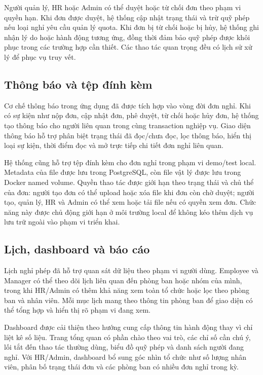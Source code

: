 Người quản lý, HR hoặc Admin có thể duyệt hoặc từ chối đơn theo phạm vi quyền hạn. Khi đơn được duyệt, hệ thống cập nhật trạng thái và trừ quỹ phép nếu loại nghỉ yêu cầu quản lý quota. Khi đơn bị từ chối hoặc bị hủy, hệ thống ghi nhận lý do hoặc hành động tương ứng, đồng thời đảm bảo quỹ phép được khôi phục trong các trường hợp cần thiết. Các thao tác quan trọng đều có lịch sử xử lý để phục vụ truy vết.

\subsection{Thông báo và tệp đính kèm}
Cơ chế thông báo trong ứng dụng đã được tích hợp vào vòng đời đơn nghỉ. Khi có sự kiện như nộp đơn, cập nhật đơn, phê duyệt, từ chối hoặc hủy đơn, hệ thống tạo thông báo cho người liên quan trong cùng transaction nghiệp vụ. Giao diện thông báo hỗ trợ phân biệt trạng thái đã đọc/chưa đọc, lọc thông báo, hiển thị loại sự kiện, thời điểm đọc và mở trực tiếp chi tiết đơn nghỉ liên quan.

Hệ thống cũng hỗ trợ tệp đính kèm cho đơn nghỉ trong phạm vi demo/test local. Metadata của file được lưu trong PostgreSQL, còn file vật lý được lưu trong Docker named volume. Quyền thao tác được giới hạn theo trạng thái và chủ thể của đơn: người tạo đơn có thể upload hoặc xóa file khi đơn còn chờ duyệt; người tạo, quản lý, HR và Admin có thể xem hoặc tải file nếu có quyền xem đơn. Chức năng này được chủ động giới hạn ở môi trường local để không kéo thêm dịch vụ lưu trữ ngoài vào phạm vi triển khai.

\subsection{Lịch, dashboard và báo cáo}
Lịch nghỉ phép đã hỗ trợ quan sát dữ liệu theo phạm vi người dùng. Employee và Manager có thể theo dõi lịch liên quan đến phòng ban hoặc nhóm của mình, trong khi HR/Admin có thêm khả năng xem toàn tổ chức hoặc lọc theo phòng ban và nhân viên. Mỗi mục lịch mang theo thông tin phòng ban để giao diện có thể tổng hợp và hiển thị rõ phạm vi đang xem.

Dashboard được cải thiện theo hướng cung cấp thông tin hành động thay vì chỉ liệt kê số liệu. Trang tổng quan có phần chào theo vai trò, các chỉ số cần chú ý, lối tắt đến thao tác thường dùng, biểu đồ quỹ phép và danh sách người đang nghỉ. Với HR/Admin, dashboard bổ sung góc nhìn tổ chức như số lượng nhân viên, phân bố trạng thái đơn và các phòng ban có nhiều đơn nghỉ trong kỳ.

